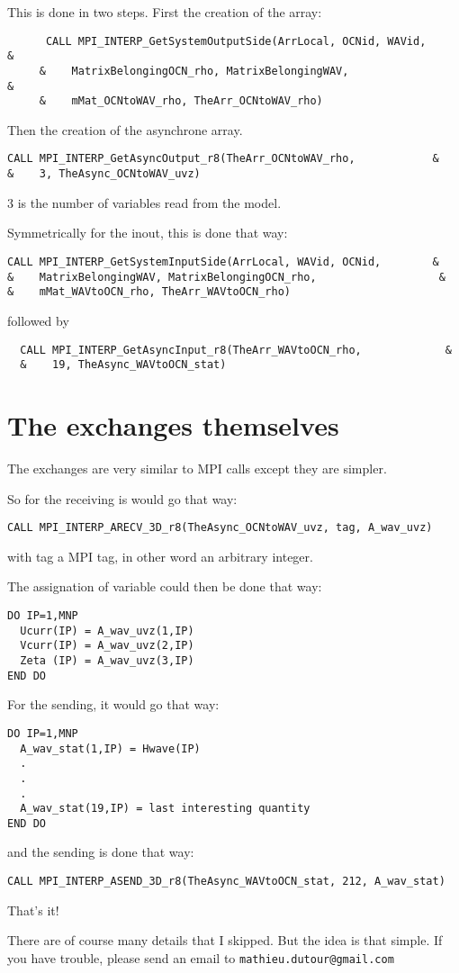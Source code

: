 \documentclass[12pt]{article}
\begin{document}
This is done in two steps. First the creation of the array:
\begin{verbatim}
      CALL MPI_INTERP_GetSystemOutputSide(ArrLocal, OCNid, WAVid,       &
     &    MatrixBelongingOCN_rho, MatrixBelongingWAV,                   &
     &    mMat_OCNtoWAV_rho, TheArr_OCNtoWAV_rho)
\end{verbatim}
Then the creation of the asynchrone array.
\begin{verbatim}
CALL MPI_INTERP_GetAsyncOutput_r8(TheArr_OCNtoWAV_rho,            &
&    3, TheAsync_OCNtoWAV_uvz)
\end{verbatim}
$3$ is the number of variables read from the model.


Symmetrically for the inout, this is done that way:
\begin{verbatim}
CALL MPI_INTERP_GetSystemInputSide(ArrLocal, WAVid, OCNid,        &
&    MatrixBelongingWAV, MatrixBelongingOCN_rho,                   &
&    mMat_WAVtoOCN_rho, TheArr_WAVtoOCN_rho)
\end{verbatim}
followed by 
\begin{verbatim}
  CALL MPI_INTERP_GetAsyncInput_r8(TheArr_WAVtoOCN_rho,             &
  &    19, TheAsync_WAVtoOCN_stat)
\end{verbatim}



\section{The exchanges themselves}

The exchanges are very similar to MPI calls except they are simpler.

So for the receiving is would go that way:
\begin{verbatim}
CALL MPI_INTERP_ARECV_3D_r8(TheAsync_OCNtoWAV_uvz, tag, A_wav_uvz)
\end{verbatim}
with tag a MPI tag, in other word an arbitrary integer.

The assignation of variable could then be done that way:
\begin{verbatim}
DO IP=1,MNP
  Ucurr(IP) = A_wav_uvz(1,IP)
  Vcurr(IP) = A_wav_uvz(2,IP)
  Zeta (IP) = A_wav_uvz(3,IP)
END DO
\end{verbatim}




For the sending, it would go that way:
\begin{verbatim}
DO IP=1,MNP
  A_wav_stat(1,IP) = Hwave(IP)
  .
  .
  .
  A_wav_stat(19,IP) = last interesting quantity
END DO
\end{verbatim}
and the sending is done that way:

\begin{verbatim}
CALL MPI_INTERP_ASEND_3D_r8(TheAsync_WAVtoOCN_stat, 212, A_wav_stat)
\end{verbatim}

That's it!

There are of course many details that I skipped. But the idea is that simple.
If you have trouble, please send an email to {\tt mathieu.dutour@gmail.com}
\end{document}
